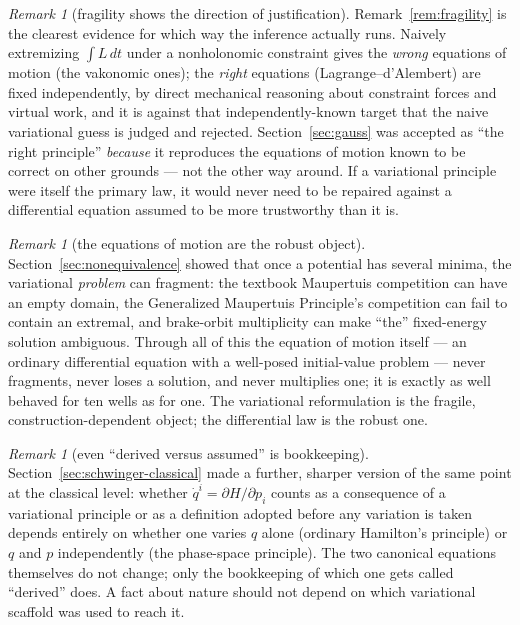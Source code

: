 \documentclass[11pt]{book}
\theoremstyle{definition}
\theoremstyle{plain}
\theoremstyle{remark}
\newtheorem{remark}[definition]{Remark}
\begin{document}
\begin{remark}[fragility shows the direction of justification]
Remark~\ref{rem:fragility} is the clearest evidence for which way the inference actually runs. Naively extremizing $\int L\,dt$ under a nonholonomic constraint gives the \emph{wrong} equations of motion (the vakonomic ones); the \emph{right} equations (Lagrange--d'Alembert) are fixed independently, by direct mechanical reasoning about constraint forces and virtual work, and it is against that independently-known target that the naive variational guess is judged and rejected. Section~\ref{sec:gauss} was accepted as ``the right principle'' \emph{because} it reproduces the equations of motion known to be correct on other grounds --- not the other way around. If a variational principle were itself the primary law, it would never need to be repaired against a differential equation assumed to be more trustworthy than it is.
\end{remark}

\begin{remark}[the equations of motion are the robust object]
Section~\ref{sec:nonequivalence} showed that once a potential has several minima, the variational \emph{problem} can fragment: the textbook Maupertuis competition can have an empty domain, the Generalized Maupertuis Principle's competition can fail to contain an extremal, and brake-orbit multiplicity can make ``the'' fixed-energy solution ambiguous. Through all of this the equation of motion itself --- an ordinary differential equation with a well-posed initial-value problem --- never fragments, never loses a solution, and never multiplies one; it is exactly as well behaved for ten wells as for one. The variational reformulation is the fragile, construction-dependent object; the differential law is the robust one.
\end{remark}

\begin{remark}[even ``derived versus assumed'' is bookkeeping]
Section~\ref{sec:schwinger-classical} made a further, sharper version of the same point at the classical level: whether $\dot q^i=\partial H/\partial p_i$ counts as a consequence of a variational principle or as a definition adopted before any variation is taken depends entirely on whether one varies $q$ alone (ordinary Hamilton's principle) or $q$ and $p$ independently (the phase-space principle). The two canonical equations themselves do not change; only the bookkeeping of which one gets called ``derived'' does. A fact about nature should not depend on which variational scaffold was used to reach it.
\end{remark}
\end{document}
